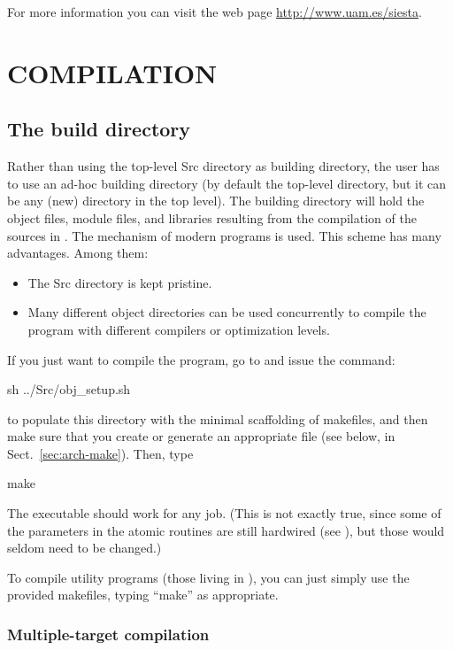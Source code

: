 For more information you can visit the web page
\url{http://www.uam.es/siesta}.

\section{COMPILATION}

\subsection{The build directory}

Rather than using the top-level Src directory as building directory,
the user has to use an ad-hoc building directory (by default the
top-level  directory, but it can be any (new) directory in
the top level).  The building directory will hold the object files,
module files, and libraries resulting from the compilation of the
sources in .  The  mechanism of modern 
programs is used. This scheme has many advantages. Among them:

\begin{itemize}
\item The Src directory is kept pristine.
\item Many different object directories can be used concurrently to
  compile the program with different compilers or optimization levels.
\end{itemize}

If you just want to compile the program, go to  and issue the
command:
\begin{shellexample}
  sh ../Src/obj_setup.sh
\end{shellexample}
to populate this directory with the minimal scaffolding of makefiles,
and then make sure that you create or generate an appropriate 
file (see below, in Sect.~\ref{sec:arch-make}). Then, type
\begin{shellexample}
  make
\end{shellexample}
The executable should work for any job. (This is not exactly true,
since some of the parameters in the atomic routines are still
hardwired (see ), but those would seldom need to
be changed.)

To compile utility programs (those living in ), you can just
simply use the provided makefiles, typing ``make'' as appropriate.

\subsubsection{Multiple-target compilation}

